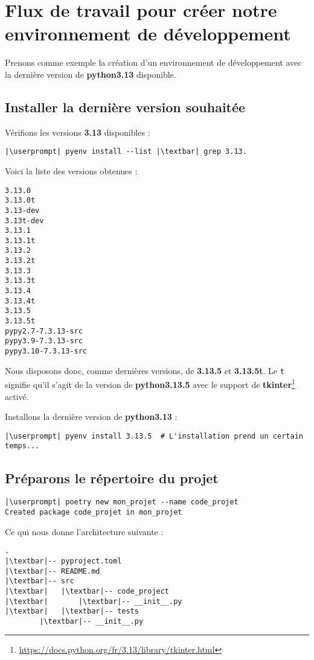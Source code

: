\section*{Flux de travail pour créer notre environnement de développement}
Prenons comme exemple la création d'un environnement de développement avec la dernière version de \textbf{python3.13} disponible.

\subsection*{Installer la dernière version souhaitée}
Vérifions les versions \textbf{3.13} disponibles :
\begin{lstlisting}[style=bash]
|\userprompt| pyenv install --list |\textbar| grep 3.13.
\end{lstlisting}

Voici la liste des versions obtenues :
\begin{verbatim}
3.13.0
3.13.0t
3.13-dev
3.13t-dev
3.13.1
3.13.1t
3.13.2
3.13.2t
3.13.3
3.13.3t
3.13.4
3.13.4t
3.13.5
3.13.5t
pypy2.7-7.3.13-src
pypy3.9-7.3.13-src
pypy3.10-7.3.13-src
\end{verbatim}

Nous disposons donc, comme dernières versions, de \textbf{3.13.5} et \textbf{3.13.5t}. Le \texttt{t} signifie qu'il s'agit de la version de \textbf{python3.13.5} avec le support de \textbf{tkinter}\footnote{\url{https://docs.python.org/fr/3.13/library/tkinter.html}} activé. 

Installons la dernière version de \textbf{python3.13} :
\begin{lstlisting}[style=bash]
|\userprompt| pyenv install 3.13.5  # L'installation prend un certain temps...
\end{lstlisting}

\subsection*{Préparons le répertoire du projet}
\begin{lstlisting}[style=bash]
|\userprompt| poetry new mon_projet --name code_projet
Created package code_projet in mon_projet
\end{lstlisting}

Ce qui nous donne l'architecture suivante :
\begin{lstlisting}[style=tree]
.
|\textbar|-- pyproject.toml
|\textbar|-- README.md
|\textbar|-- src
|\textbar|   |\textbar|-- code_project
|\textbar|       |\textbar|-- __init__.py
|\textbar|   |\textbar|-- tests
        |\textbar|-- __init__.py
\end{lstlisting}

